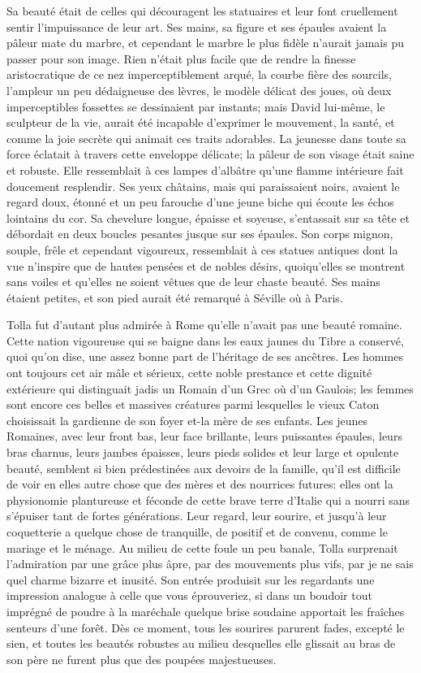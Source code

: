 Sa beauté était de celles qui découragent les statuaires et leur font cruellement sentir l’impuissance de leur art. Ses mains, sa figure et ses épaules avaient la pâleur mate du marbre, et cependant le marbre le plus fidèle n’aurait jamais pu passer pour son image. Rien n’était plus facile que de rendre la finesse aristocratique de ce nez imperceptiblement arqué, la courbe fière des sourcils, l’ampleur un peu dédaigneuse des lèvres, le modèle délicat des joues, où deux imperceptibles fossettes se dessinaient par instants; mais David lui-même, le sculpteur de la vie, aurait été incapable d’exprimer le mouvement, la santé, et comme la joie secrète qui animait ces traits adorables. La jeunesse dans toute sa force éclatait à travers cette enveloppe délicate; la pâleur de son visage était saine et robuste. Elle ressemblait à ces lampes d’albâtre qu’une flamme intérieure fait doucement resplendir. Ses yeux châtains, mais qui paraissaient noirs, avaient le regard doux, étonné et un peu farouche d’une jeune biche qui écoute les échos lointains du cor. Sa chevelure longue, épaisse et soyeuse, s’entassait sur sa tête et débordait en deux boucles pesantes jusque sur ses épaules. Son corps mignon, souple, frêle et cependant vigoureux, ressemblait à ces statues antiques dont la vue n’inspire que de hautes pensées et de nobles désirs, quoiqu’elles se montrent sans voiles et qu’elles ne soient vêtues que de leur chaste beauté. Ses mains étaient petites, et son pied aurait été remarqué à Séville où à Paris.

Tolla fut d’autant plus admirée à Rome qu’elle n’avait pas une beauté romaine. Cette nation vigoureuse qui se baigne dans les eaux jaunes du Tibre a conservé, quoi qu’on dise, une assez bonne part de l’héritage de ses ancêtres. Les hommes ont toujours cet air mâle et sérieux, cette noble prestance et cette dignité extérieure qui distinguait jadis un Romain d’un Grec où d’un Gaulois; les femmes sont encore ces belles et massives créatures parmi lesquelles le vieux Caton choisissait la gardienne de son foyer et-la mère de ses enfants. Les jeunes Romaines, avec leur front bas, leur face brillante, leurs puissantes épaules, leurs bras charnus, leurs jambes épaisses, leurs pieds solides et leur large et opulente beauté, semblent si bien prédestinées aux devoirs de la famille, qu’il est difficile de voir en elles autre chose que des mères et des nourrices futures: elles ont la physionomie plantureuse et féconde de cette brave terre d’Italie qui a nourri sans s’épuiser tant de fortes générations. Leur regard, leur sourire, et jusqu’à leur coquetterie a quelque chose de tranquille, de positif et de convenu, comme le mariage et le ménage. Au milieu de cette foule un peu banale, Tolla surprenait l’admiration par une grâce plus âpre, par des mouvements plus vifs, par je ne sais quel charme bizarre et inusité. Son entrée produisit sur les regardants une impression analogue à celle que vous éprouveriez, si dans un boudoir tout imprégné de poudre à la maréchale quelque brise soudaine apportait les fraîches senteurs d’une forêt. Dès ce moment, tous les sourires parurent fades, excepté le sien, et toutes les beautés robustes au milieu desquelles elle glissait au bras de son père ne furent plus que des poupées majestueuses.

